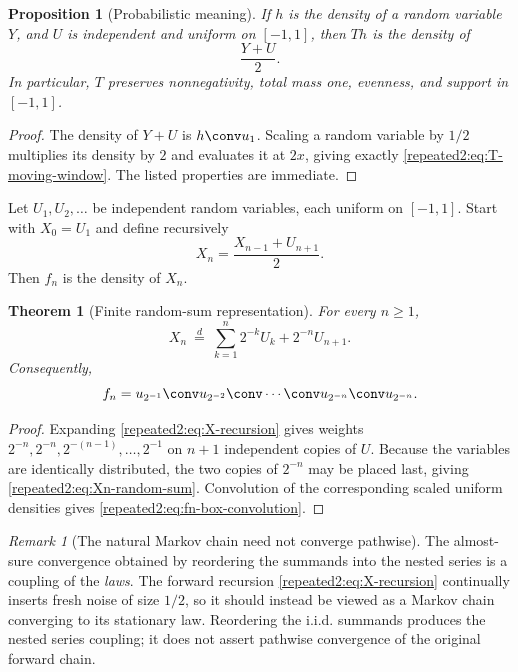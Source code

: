 \documentclass[11pt,oneside]{article}
\newtheorem{theorem}{Theorem}[section]
\newtheorem{proposition}[proposition]{Proposition}
\theoremstyle{definition}
\theoremstyle{remark}
\newtheorem{remark}[remark]{Remark}
\begin{document}
\begin{proposition}[Probabilistic meaning]
\label{repeated2:prop:T-probability}
If $h$ is the density of a random variable $Y$, and $U$ is independent and uniform on
$[-1,1]$, then $Th$ is the density of
\begin{equation}
 \frac{Y+U}{2}.
 \label{repeated2:eq:T-random-map}
\end{equation}
In particular, $T$ preserves nonnegativity, total mass one, evenness, and support in
$[-1,1]$.
\end{proposition}

\begin{proof}
The density of $Y+U$ is $h\conv u_1$.  Scaling a random variable by $1/2$ multiplies its
density by $2$ and evaluates it at $2x$, giving exactly \eqref{repeated2:eq:T-moving-window}.
The listed properties are immediate.
\end{proof}

Let $U_1,U_2,\ldots$ be independent random variables, each uniform on $[-1,1]$.
Start with $X_0=U_1$ and define recursively
\begin{equation}
 X_n=\frac{X_{n-1}+U_{n+1}}{2}.
 \label{repeated2:eq:X-recursion}
\end{equation}
Then $f_n$ is the density of $X_n$.

\begin{theorem}[Finite random-sum representation]
\label{repeated2:thm:finite-random-sum}
For every $n\ge1$,
\begin{equation}
 X_n\ \stackrel{d}{=}\
 \sum_{k=1}^{n}2^{-k}U_k+2^{-n}U_{n+1}.
 \label{repeated2:eq:Xn-random-sum}
\end{equation}
Consequently,
\begin{equation}
 f_n=u_{2^{-1}}\conv u_{2^{-2}}\conv\cdots\conv
 u_{2^{-n}}\conv u_{2^{-n}}.
 \label{repeated2:eq:fn-box-convolution}
\end{equation}
\end{theorem}

\begin{proof}
Expanding \eqref{repeated2:eq:X-recursion} gives weights
$2^{-n},2^{-n},2^{-(n-1)},\ldots,2^{-1}$ on $n+1$ independent copies of $U$.
Because the variables are identically distributed, the two copies of $2^{-n}$ may be
placed last, giving \eqref{repeated2:eq:Xn-random-sum}.  Convolution of the corresponding scaled
uniform densities gives \eqref{repeated2:eq:fn-box-convolution}.
\end{proof}

\begin{remark}[The natural Markov chain need not converge pathwise]
The almost-sure convergence obtained by reordering the summands into the nested series is a
coupling of the \emph{laws}.  The forward recursion \eqref{repeated2:eq:X-recursion}
continually inserts fresh noise of size $1/2$, so it should instead be viewed as a Markov
chain converging to its stationary law.  Reordering the i.i.d. summands produces the nested
series coupling; it does not assert pathwise convergence of the original forward chain.
\end{remark}
\end{document}
